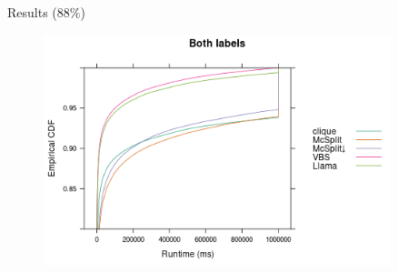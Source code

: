 \documentclass{beamer}
\begin{document}
\begin{frame}{Results (88\%)}
  \begin{figure}
    \centering
    \includegraphics[width=0.9\textwidth]{../dissertation/images/ecdf_both_labels_llama.png}
  \end{figure}
\end{frame}


\end{document}
